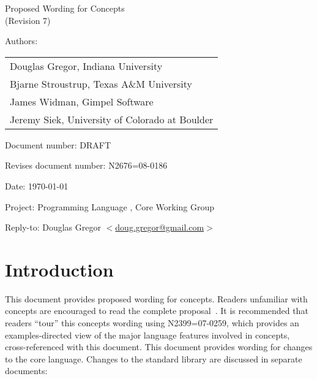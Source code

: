 \documentclass[american]{book}
\begin{document}
\raggedbottom

\begin{titlepage}
\huge
\begin{center}
Proposed Wording for Concepts\\
(Revision 7)
\end{center}

\normalsize
\vspace{0.25in}
\par\noindent Authors: 
\begin{tabular}[t]{l}
Douglas Gregor, Indiana University \\
Bjarne Stroustrup, Texas A\&M University \\
James Widman, Gimpel Software \\
Jeremy Siek, University of Colorado at Boulder
\end{tabular}\vspace{-6pt}

\par\noindent Document number:  DRAFT\vspace{-6pt}
\par\noindent Revises document number: N2676=08-0186 \vspace{-6pt}
\par\noindent Date: \today\vspace{-6pt}
\par\noindent Project: Programming Language \Cpp{}, Core Working Group\vspace{-6pt}
\par\noindent Reply-to: Douglas Gregor $<$\href{mailto:doug.gregor@gmail.com}{doug.gregor@gmail.com}$>$

\section*{Introduction}
This document provides proposed wording for concepts. Readers
unfamiliar with concepts are encouraged to read the complete
proposal~\cite{GregorStroustrup06:concepts_rev_1}. 
%
It is recommended that readers ``tour'' this concepts wording using
N2399=07-0259, which provides an examples-directed view of the major
language features involved in concepts, cross-referenced with this
document.  
%
This document
provides wording for changes to the core language. Changes to the
standard library are discussed in separate documents:


\end{titlepage}
\end{document}
